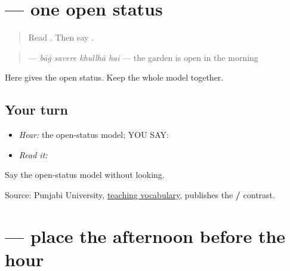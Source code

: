 \section[\texorpdfstring{\pa{ਬਾਗ਼} \pa{ਸਵੇਰੇ} \pa{ਖੁੱਲ੍ਹਾ} \pa{ਹੈ} (baagh savere …)}{ਬਾਗ਼ ਸਵੇਰੇ ਖੁੱਲ੍ਹਾ ਹੈ (baagh savere …)}]{    — one open status}

\label{lesson:PA-C179-khullha}



\begin{quote}
Read \textbf{}. Then say \textbf{}.
\end{quote}

\begin{grammarlens}[title={Grammar Lens: one open status}]
\begin{quote}
\textbf{   } — \emph{bāġ savere khullhā hai} — the garden is open in the morning
\end{quote}

Here \textbf{} gives the open status. Keep the whole model together.
\end{grammarlens}

\subsection*{Your turn}
\begin{itemize}
\raggedright
  \item \emph{Hear:} the open-status model; YOU SAY: \textbf{   }
  \item \emph{Read it:} \textbf{   }
\end{itemize}

\begin{tcolorbox}[breakable,colback=teal!4,colframe=teal!35!black,title={Before you move on}]
Say the open-status model without looking.

Source: Punjabi University, \href{https://pnarang.weebly.com/uploads/1/4/5/6/14563640/vocab\_f.pdf}{teaching vocabulary}, publishes the \textbf{/} contrast.
\end{tcolorbox}
\section[\texorpdfstring{\pa{ਦੁਪਹਿਰ} \pa{ਦੋ} \pa{ਵਜੇ} (dupahir do vaje)}{ਦੁਪਹਿਰ ਦੋ ਵਜੇ (dupahir do vaje)}]{   — place the afternoon before the hour}

